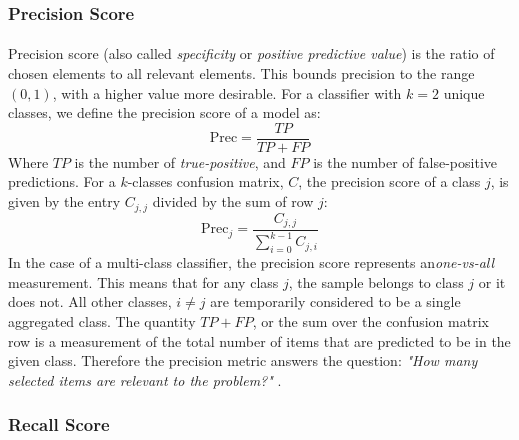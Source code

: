 \documentclass[12pt,letterpaper]{article}
\begin{document}

\subsubsection{Precision Score}

\paragraph*{}Precision score (also called \textit{specificity} or \textit{positive predictive value}) is the ratio of chosen elements to all relevant elements. This bounds precision to the range $(0,1)$, with a higher value more desirable. For a classifier with $k = 2$ unique classes, we define the precision score of a model as:
\begin{equation}
\label{eqn-BinaryPrecision}
\text{Prec} = \frac{TP}{TP + FP}
\end{equation}
Where $TP$ is the number of \textit{true-positive}, and $FP$ is the number of false-positive predictions. For a $k$-classes confusion matrix, $C$, the precision score of a class $j$, is given by the entry $C_{j,j}$ divided by the sum of row $j$:
\begin{equation}
\label{eqn-KPrecision}
\text{Prec}_j = \frac{C_{j,j}}{\sum_{i=0}^{k-1}C_{j,i}}
\end{equation}
In the case of a multi-class classifier, the precision score represents an\textit{one-vs-all} measurement. This means that for any class $j$, the sample belongs to class $j$ or it does not. All other classes, $i \neq j$ are temporarily considered to be a single aggregated class. The quantity $TP + FP$, or the sum over the confusion matrix row is a measurement of the total number of items that are predicted to be in the given class. Therefore the precision metric answers the question: \textit{"How many selected items are relevant to the problem?"} \cite{Geron,James}.


\subsubsection{Recall Score}
\end{document}
